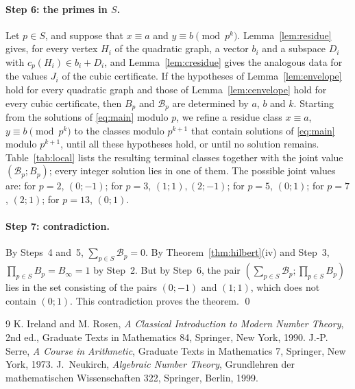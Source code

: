\documentclass[11pt]{article}
\begin{document}
\paragraph{Step 6: the primes in $S$.} Let $p\in S$, and suppose that $x\equiv a$ and $y\equiv b\pmod{p^k}$. Lemma~\ref{lem:residue} gives, for every vertex $H_i$ of the quadratic graph, a vector $b_i$ and a subspace $D_i$ with $c_p(H_i)\in b_i+D_i$, and Lemma~\ref{lem:cresidue} gives the analogous data for the values $J_i$ of the cubic certificate. If the hypotheses of Lemma~\ref{lem:envelope} hold for every quadratic graph and those of Lemma~\ref{lem:cenvelope} hold for every cubic certificate, then $B_p$ and $\mathcal B_p$ are determined by $a$, $b$ and $k$. Starting from the solutions of \eqref{eq:main} modulo $p$, we refine a residue class $x\equiv a$, $y\equiv b\pmod{p^k}$ to the classes modulo $p^{k+1}$ that contain solutions of \eqref{eq:main} modulo $p^{k+1}$, until all these hypotheses hold, or until no solution remains. Table~\ref{tab:local} lists the resulting terminal classes together with the joint value $(\mathcal B_p;B_p)$; every integer solution lies in one of them. The possible joint values are: for $p=2$, $(0;-1)$; for $p=3$, $(1;1),\allowbreak (2;-1)$; for $p=5$, $(0;1)$; for $p=7$, $(2;1)$; for $p=13$, $(0;1)$.

\paragraph{Step 7: contradiction.} By Steps~4 and~5, $\sum_{p\in S}\mathcal B_p=0$. By Theorem~\ref{thm:hilbert}(iv) and Step~3, $\prod_{p\in S}B_p=B_\infty=1$ by Step~2. But by Step~6, the pair $(\textstyle\sum_{p\in S}\mathcal B_p;\prod_{p\in S}B_p)$ lies in the set consisting of the pairs $(0;-1)$ and $(1;1)$, which does not contain $(0;1)$. This contradiction proves the theorem.
\qed

\begin{thebibliography}{9}
 K. Ireland and M. Rosen, \emph{A Classical Introduction to Modern Number Theory}, 2nd ed., Graduate Texts in Mathematics 84, Springer, New York, 1990.
 J.-P. Serre, \emph{A Course in Arithmetic}, Graduate Texts in Mathematics 7, Springer, New York, 1973.
 J.~Neukirch, \emph{Algebraic Number Theory}, Grundlehren der mathematischen Wissenschaften 322, Springer, Berlin, 1999.
\end{thebibliography}
\end{document}
